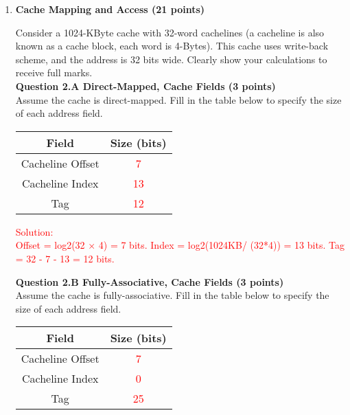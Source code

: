 \documentclass[a4paper,10pt]{article}
\begin{document}
\begin{enumerate}
{{    }%
}
\\


\item \textbf{Cache Mapping and Access (21 points)} 

Consider a 1024-KByte cache with 32-word cachelines (a cacheline is also known as a cache block, each word is 4-Bytes). This cache uses write-back scheme, and the address is 32 bits wide. Clearly show your calculations to receive full marks. \\

\textbf{Question 2.A Direct-Mapped, Cache Fields (3 points)}\\
Assume the cache is direct-mapped. Fill in the table below to specify the size of each address field.\\

\begin{center}
\begin{tabular}{cc}
\toprule  
\textbf{Field} & \textbf{ Size (bits)} \\
\midrule  
Cacheline Offset& \textcolor{red}{7}\\
\midrule
Cacheline Index& \textcolor{red}{13}\\
\midrule
Tag& \textcolor{red}{12}\\
\bottomrule 
\end{tabular}
\end{center}

\noindent\fbox
{%
    \parbox{\linewidth}
    {%
       \textcolor{red}{Solution: \\
       Offset = log2(32 × 4) = 7 bits. 
       Index = log2(1024KB/ (32*4)) = 13 bits. 
       Tag = 32 - 7 - 13 = 12 bits.}
    }%
}

\textbf{Question 2.B Fully-Associative, Cache Fields (3 points)}\\
Assume the cache is fully-associative. Fill in the table below to specify the size of each address field.\\

\begin{center}
\begin{tabular}{cc}
\toprule  
\textbf{Field} & \textbf{ Size (bits)} \\
\midrule  
Cacheline Offset& \textcolor{red}{7}\\
\midrule
Cacheline Index& \textcolor{red}{0}\\
\midrule
Tag& \textcolor{red}{25}\\
\bottomrule 
\end{tabular}
\end{center}


\end{enumerate}
\end{document}
